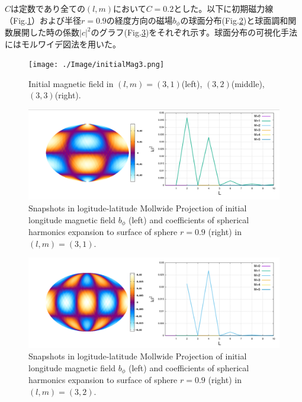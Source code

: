 \documentclass[12pt]{jsarticle}
\begin{document}
$C$は定数であり全ての$(l,m)$において$C=0.2$とした。以下に初期磁力線（Fig.\ref{initialMag1}）および半径$r=0.9$の経度方向の磁場$b_\phi$の球面分布(Fig.\ref{b0p_L3M1})と球面調和関数展開した時の係数$|c|^2$のグラフ(Fig.\ref{b0p_L3M2})をそれぞれ示す。球面分布の可視化手法にはモルワイデ図法を用いた。
\begin{figure}[H]
\centering
\texttt{[image: ./Image/initialMag3.png]}
\caption{Initial magnetic field in $(l,m)=(3,1)$(left), $(3,2)$(middle), $(3,3)$(right).  } \label{initialMag1}
\end{figure}

\begin{figure}[H]
\centering
\includegraphics[height=1.0\textheight,width=1.0\hsize,angle=0,keepaspectratio]{./Image/b0p_L3M1.png}
\caption{Snapshots in logitude-latitude Mollwide Projection of initial longitude magnetic field $b_\phi$ (left) and coefficients of spherical harmonics expansion to surface of sphere $r=0.9$ (right) in $(l,m)=(3,1)$.  } \label{b0p_L3M1}
\end{figure}

\begin{figure}[H]
\centering
\includegraphics[height=1.0\textheight,width=1.0\hsize,angle=0,keepaspectratio]{./Image/b0p_L3M2.png}
\caption{Snapshots in logitude-latitude Mollwide Projection of initial longitude magnetic field $b_\phi$ (left) and coefficients of spherical harmonics expansion to surface of sphere $r=0.9$ (right) in $(l,m)=(3,2)$.  } \label{b0p_L3M2}
\end{figure}
\end{document}
